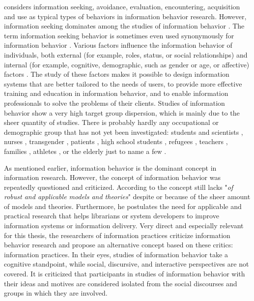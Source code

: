 \documentclass[12pt, a4paper, titlepage, oneside, abstract=true, toc=listof, toc=bibliography, BCOR=1cm]{scrreprt}
\begin{document}
\citet[p. 50]{Ford2015} considers information seeking, avoidance, evaluation, encountering, acquisition and use as typical types of behaviors in information behavior research. However, information seeking dominates among the studies of information behavior \citep{Greifeneder2014}. The term information seeking behavior is sometimes even used synonymously for information behavior \citep[e.g.][]{Urquhart2011}. 
Various factors influence the information behavior of individuals, both external (for example, roles, status, or social relationships) and internal (for example, cognitive, demographic, such as gender or age, or affective) factors \citep [pp. 99ff]{Ford2015}.  The study of these factors makes it possible to design information systems that are better tailored to the needs of users, to provide more effective training and education in information behavior, and to enable information professionals to solve the problems of their clients.
Studies of information behavior show a very high target group dispersion, which is mainly due to the sheer quantity of studies. There is probably hardly any occupational or demographic group that has not yet been investigated: students and scientists \citep[e.g.][]{Campbell2017, Hemminger2007, Rowlands2008}, nurses \citep{Urquhart1994}, transgender \citep{Pohjanen2016}, patients \citep{Pettigrew1999}, high school students \citep{Koh2019}, refugees \citep{Hassan2019}, teachers \citep{Diekema2012}, families \citep{Veinot2011}, athletes \citep{Adams2013}, or the elderly \citep{Williamson2009} just to name a few \citep[see ][p. 277ff, for an overview of different groups or roles in  information behavior research]{Case2016}. 

As mentioned earlier, information behavior is the dominant concept in information research. However, the concept of information behavior was repeatedly questioned and criticized. According to \citet[p. 238]{Ford2015} the concept still lacks "\textit{of robust and applicable models and theories}" despite or because of the sheer amount of models and theories. Furthermore, he postulates the need for applicable and practical research that helps librarians or system developers to improve information systems or information delivery. Very direct and especially relevant for this thesis, the researchers of information practices criticize information behavior research \citep[p. 116ff]{Savolainen2006} and propose an alternative concept based on these critics: information practices. In their eyes, studies of information behavior take a cognitive standpoint, while social, discursive, and interactive perspectives are not covered. It is criticized that participants in studies of information behavior with their ideas and motives are considered isolated from the social discourses and groups in which they are involved. 
\end{document}
